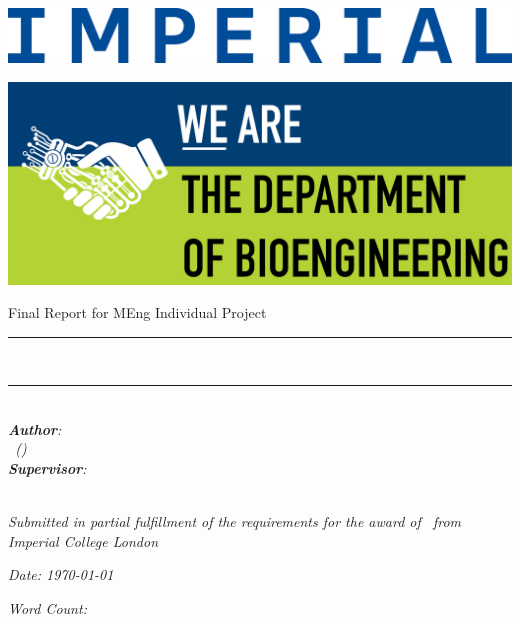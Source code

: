 \begin{titlepage}
\Large

\begin{minipage}{0.4\textwidth}
    \includegraphics[width=\textwidth]{figures/IMPERIAL_Wordmark_CMYK_Blue_2024.eps}
\end{minipage}
\hfill
\begin{minipage}{0.4\textwidth}
\begin{flushright}
    \includegraphics[width=.9\textwidth]{figures/Bioeng.png}
\end{flushright}
\end{minipage}

\vspace{1.5cm}

\begin{center}
    {\huge Final Report for MEng Individual Project} \\ [1cm]
    \rule{\textwidth}{.1cm} \\[0.4cm]
    {\Huge \textbf{\reporttitle}}
    \rule{\textwidth}{.1cm} \\ [1.5cm]

    \textit{\textbf{Author}: \\ \reportauthor \ (\cid)} \\ [1cm]
    \textit{\textbf{Supervisor}: \\ \reportsupervisor} \\ [1cm]

    \vspace{2cm}

    \textit{Submitted in partial fulfillment of the requirements for the award of \degree \ from Imperial College London}

    \vfill
    
    \begin{minipage}{0.5\textwidth}
    \centering
        \textit{Date: \today} \\ [1cm]
    \end{minipage}
    \hfill
    \begin{minipage}{0.4\textwidth}
    \centering
        \textit{Word Count: \wordcount} \\ [1cm]
    \end{minipage}
\end{center}

\end{titlepage}